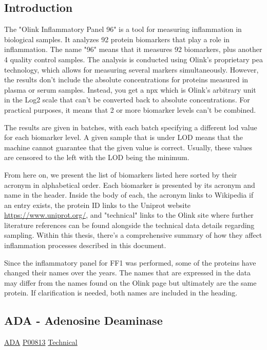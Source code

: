 \subsection{Introduction}

The "Olink Inflammatory Panel 96" is a tool for measuring inflammation in biological samples. It analyzes 92 protein biomarkers that play a role in inflammation. The name "96" means that it measures 92 biomarkers, plus another 4 quality control samples. The analysis is conducted using Olink's proprietary \gls{pea} technology, which allows for measuring several markers simultaneously. However, the results don't include the absolute concentrations for proteins measured in plasma or serum samples. Instead, you get a \gls{npx} which is Olink’s arbitrary unit in the Log2 scale that can't be converted back to absolute concentrations. For practical purposes, it means that 2 or more biomarker levels can't be combined. 

The results are given in batches, with each batch specifying a different \gls{lod} value for each biomarker level. A given sample that is under LOD means that the machine cannot guarantee that the given value is correct. Usually, these values are censored to the left with the LOD being the minimum.

From here on, we present the list of biomarkers listed here sorted by their acronym in alphabetical order. Each biomarker is presented by its acronym and name in the header. Inside the body of each, the acronym links to Wikipedia if an entry exists, the protein ID links to the Uniprot website \url{https://www.uniprot.org/}, and "technical" links to the Olink site where further literature references can be found alongside the technical data details regarding sampling. Within this thesis, there's a comprehensive summary of how they affect inflammation processes described in this document.

Since the inflammatory panel for FF1 was performed, some of the proteins have changed their names over the years. The names that are expressed in the data may differ from the names found on the Olink page but ultimately are the same protein. If clarification is needed, both names are included in the heading.

\subsection{ADA - Adenosine Deaminase}

\href{https://en.wikipedia.org/wiki/Adenosine\_deaminase}{ADA} \href{http://www.uniprot.org/uniprot/P00813}{P00813}
\href{https://olink.com/products-services/target/protein/?assayID=5112}{Technical}

